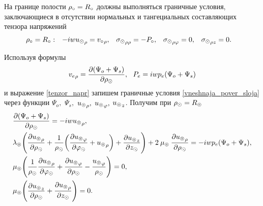 На границе полости $\rho_\circ=R_\circ$ должны выполняться граничные условия, заключающиеся в отсутствии нормальных и тангециальных составляющих тензора напряжений
\begin{equation}\label{gran_pol}
\begin{aligned}
\rho_\circ &=R_\circ: &-iw{u_\odot}_{\rho}&={v_\circ}_{\rho}, &{\sigma_\odot}_{\rho\rho}&=-P_\circ, &{\sigma_\odot}_{\rho\varphi}&=0, &{\sigma_\odot}_{\rho z}&=0.
\end{aligned}
\end{equation}

Используя формулы
$${v_e}_{\rho}=\frac{\partial(\Psi_{o}+\Psi_s)}{\partial\rho_\odot},\:\:\: P_e=iwp_e(\Psi_{o}+\Psi_s)$$
и выражение \eqref{tenzor_napr} запишем граничные условия \eqref{vneshnaja_pover_sloja} через функции $\Psi_{o},$ $\Psi_s,$ ${u_\circledcirc}_\rho,$ ${u_\circledcirc}_\varphi,$ ${u_\circledcirc}_z$. Получим при $\rho_\odot=R_\circledcirc$
\begin{align}
&\frac{\partial(\Psi_{o}+\Psi_s)}{\partial\rho_\odot}=-iw{u_\circledcirc}_{\rho},\\
&\lambda_\circledcirc\Biggl(\frac{\partial {u_\circledcirc}_{\rho}}{\partial \rho_\odot}+\frac{1}{\rho_\odot}\biggl(\frac{\partial {u_\circledcirc}_\varphi}{\partial\varphi_\odot}+{u_\circledcirc}_{\rho}\biggr)+\frac{\partial {u_\circledcirc}_z}{\partial z_\odot}\Biggr)+2\:\mu_\circledcirc\:\frac{\partial {u_\circledcirc}_{\rho}}{\partial \rho_\odot}=-iwp_e(\Psi_{o}+\Psi_s),\\
&\mu_\circledcirc\Biggl(\frac{1}{\rho_\odot}\frac{\partial {u_\circledcirc}_{\rho}}{\partial\varphi_\odot}+\frac{\partial {u_\circledcirc}_{\varphi}}{\partial \rho_\odot}-\frac{{u_\circledcirc}_{\varphi}}{\rho_\odot}\Biggr)=0,\\
&\mu_\circledcirc\Biggl(\frac{\partial {u_\circledcirc}_z}{\partial \rho_\odot}+\frac{\partial {u_\circledcirc}_{\rho}}{\partial z_\odot}\Biggr)=0.
\end{align}

